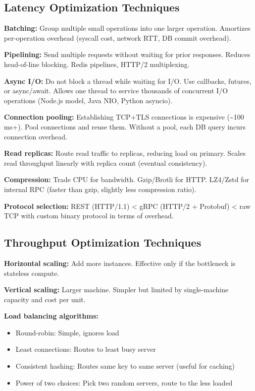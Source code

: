\documentclass[11pt]{article}
\providecommand{\tightlist}{\setlength{\itemsep}{1pt}\setlength{\parskip}{0pt}}
\begin{document}
\subsection{Latency Optimization Techniques}\label{latency-optimization-techniques}

\textbf{Batching:} Group multiple small operations into one larger operation. Amortizes per-operation overhead (syscall cost, network RTT, DB commit overhead).

\textbf{Pipelining:} Send multiple requests without waiting for prior responses. Reduces head-of-line blocking. Redis pipelines, HTTP/2 multiplexing.

\textbf{Async I/O:} Do not block a thread while waiting for I/O. Use callbacks, futures, or async/await. Allows one thread to service thousands of concurrent I/O operations (Node.js model, Java NIO, Python asyncio).

\textbf{Connection pooling:} Establishing TCP+TLS connections is expensive (\textasciitilde100 ms+). Pool connections and reuse them. Without a pool, each DB query incurs connection overhead.

\textbf{Read replicas:} Route read traffic to replicas, reducing load on primary. Scales read throughput linearly with replica count (eventual consistency).

\textbf{Compression:} Trade CPU for bandwidth. Gzip/Brotli for HTTP. LZ4/Zstd for internal RPC (faster than gzip, slightly less compression ratio).

\textbf{Protocol selection:} REST (HTTP/1.1) \textless{} gRPC (HTTP/2 + Protobuf) \textless{} raw TCP with custom binary protocol in terms of overhead.

\subsection{Throughput Optimization Techniques}\label{throughput-optimization-techniques}

\textbf{Horizontal scaling:} Add more instances. Effective only if the bottleneck is stateless compute.

\textbf{Vertical scaling:} Larger machine. Simpler but limited by single-machine capacity and cost per unit.

\textbf{Load balancing algorithms:}

\begin{itemize}
\tightlist
\item
  Round-robin: Simple, ignores load
\item
  Least connections: Routes to least busy server
\item
  Consistent hashing: Routes same key to same server (useful for caching)
\item
  Power of two choices: Pick two random servers, route to the less loaded
\end{itemize}
\end{document}
